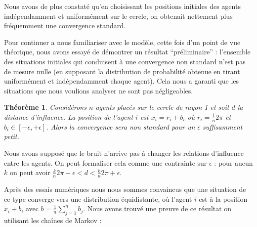 \documentclass[a4paper,10pt]{article}
\newtheorem{theorem}{Théorème}
\begin{document}
Nous avons de plus constaté qu'en choisissant les positions initiales des agents indépendamment et uniformément sur le cercle, on obtenait nettement plus fréquemment une convergence standard.

Pour continuer a nous familiariser avec le modèle, cette fois d'un point de vue théorique, nous avons essayé de démontrer un résultat ``préliminaire'' : l'ensemble des situations initiales qui conduisent à une convergence non standard n'est pas de mesure nulle (en supposant la distribution de probabilité obtenue en tirant uniformément et indépendamment chaque agent). Cela nous a garanti que les situations que nous voulions analyser ne sont pas négligeables.

\begin{theorem}
\label{convergence-non-standard}
Considérons $n$ agents placés sur le cercle de rayon 1 et soit $d$ la distance d'influence. La position de l'agent $i$ est $x_i = r_i + b_i$ où $r_i = \frac{i}{n} 2 \pi$ et $b_i \in [-\epsilon, +\epsilon]$. Alors la convergence sera non standard pour un $\epsilon$ suffisamment petit.
\end{theorem}

Nous avons supposé que le bruit n'arrive pas à changer les relations d'influence entre les agents. On peut formaliser cela comme une contrainte sur $\epsilon$ : pour aucun $k$ on peut avoir $\frac{k}{n} 2 \pi - \epsilon < d < \frac{k}{n} 2 \pi + \epsilon$.

Après des essais numériques nous nous sommes convaincus que une situation de ce type converge vers une distribution équidistante, où l'agent $i$ est à la position $x_i + \bar b$, avec $\bar b = \frac{1}{n} \sum_{j=1}^n b_j$. Nous avons trouvé une preuve de ce résultat on utilisant les chaînes de Markov :
\end{document}
